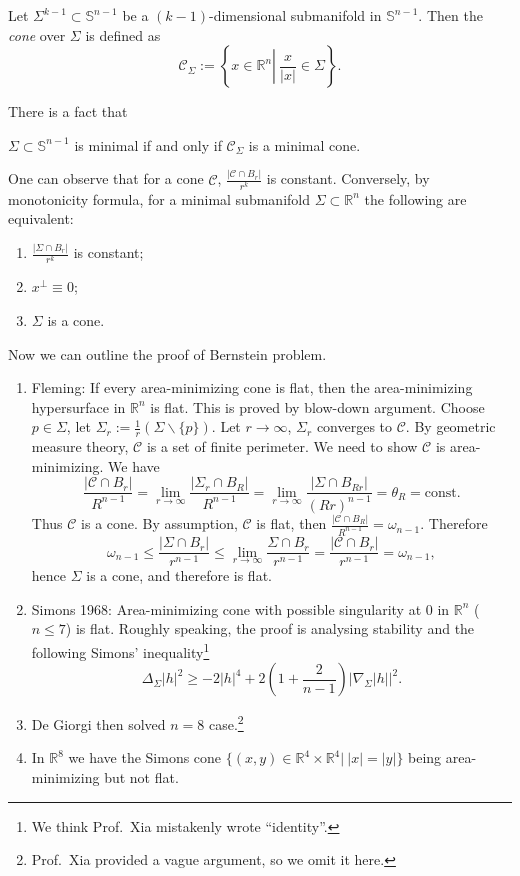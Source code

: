 \begin{defn}
    Let $\Sigma^{k-1}\subset\mathbb{S}^{n-1}$ be a $(k-1)$-dimensional submanifold in $\mathbb{S}^{n-1}$.
    Then the \emph{cone} over $\Sigma$ is defined as
    \[\mathscr{C}_\Sigma:=\left\{x\in\mathbb{R}^n\left|\ \frac{x}{|x|}\in\Sigma\right.\right\}.\]
\end{defn}

There is a fact that
\begin{prop}
    $\Sigma\subset\mathbb{S}^{n-1}$ is minimal if and only if $\mathscr{C}_\Sigma$ is a minimal cone.
\end{prop}

One can observe that for a cone $\mathscr{C}$, $\frac{|\mathscr{C}\cap B_r|}{r^k}$ is constant.
Conversely, by monotonicity formula, for a minimal submanifold $\Sigma\subset\mathbb{R}^n$ the following are equivalent:
\begin{enumerate}[(1)]
    \item $\frac{|\Sigma\cap B_r|}{r^k}$ is constant;
    \item $x^\perp\equiv 0$;
    \item $\Sigma$ is a cone.
\end{enumerate}

Now we can outline the proof of Bernstein problem.
\begin{enumerate}
    \item Fleming:
    If every area-minimizing cone is flat, then the area-minimizing hypersurface in $\mathbb{R}^n$ is flat.
    This is proved by blow-down argument.
    Choose $p\in\Sigma$, let $\Sigma_r:=\frac{1}{r}(\Sigma\backslash\{p\})$.
    Let $r\to\infty$, $\Sigma_r$ converges to $\mathscr{C}$.
    By geometric measure theory, $\mathscr{C}$ is a set of finite perimeter.
    We need to show $\mathscr{C}$ is area-minimizing.
    We have
    \[\frac{|\mathscr{C}\cap B_r|}{R^{n-1}}=\lim_{r\to\infty}\frac{|\Sigma_r\cap B_R|}{R^{n-1}}=\lim_{r\to\infty}\frac{|\Sigma\cap B_{Rr}|}{(Rr)^{n-1}}=\theta_R=\text{const}.\]
    Thus $\mathscr{C}$ is a cone.
    By assumption, $\mathscr{C}$ is flat, then $\frac{|\mathscr{C}\cap B_R|}{R^{n-1}}=\omega_{n-1}$.
    Therefore
    \[\omega_{n-1}\leq\frac{|\Sigma\cap B_r|}{r^{n-1}}\leq\lim_{r\to\infty}\frac{\Sigma\cap B_r}{r^{n-1}}=\frac{|\mathscr{C}\cap B_r|}{r^{n-1}}=\omega_{n-1},\]
    hence $\Sigma$ is a cone, and therefore is flat.
    \item Simons 1968:
    Area-minimizing cone with possible singularity at $0$ in $\mathbb{R}^n$ ($n\leq 7$) is flat.
    Roughly speaking, the proof is analysing stability and the following Simons' inequality\footnote{We think Prof.\ Xia mistakenly wrote ``identity''.}
    \[\Delta_\Sigma|h|^2\geq -2|h|^4+2\left(1+\frac{2}{n-1}\right)|\nabla_\Sigma|h||^2.\]
    \item De Giorgi then solved $n=8$ case.\footnote{Prof.\ Xia provided a vague argument, so we omit it here.}
    \item In $\mathbb{R}^8$ we have the Simons cone $\{(x,y)\in\mathbb{R}^4\times\mathbb{R}^4|\ |x|=|y|\}$ being area-minimizing but not flat.
\end{enumerate}

